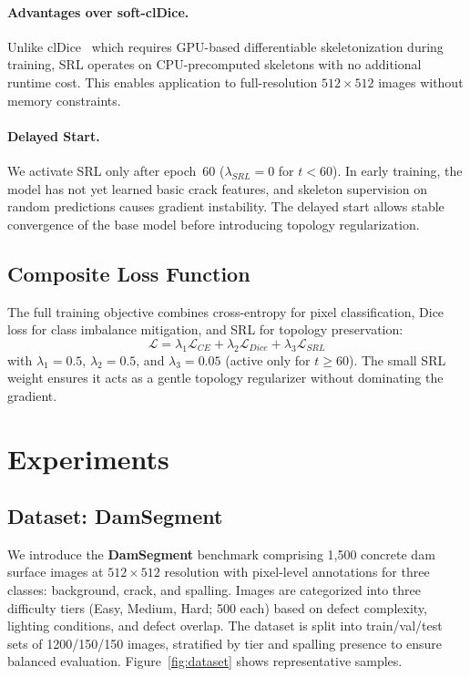 \documentclass[10pt,twocolumn,letterpaper]{article}
\begin{document}
\paragraph{Advantages over soft-clDice.} Unlike clDice~\cite{shit2021cldice} which requires GPU-based differentiable skeletonization during training, SRL operates on CPU-precomputed skeletons with no additional runtime cost. This enables application to full-resolution $512{\times}512$ images without memory constraints.

\paragraph{Delayed Start.} We activate SRL only after epoch~60 ($\lambda_{SRL} = 0$ for $t < 60$). In early training, the model has not yet learned basic crack features, and skeleton supervision on random predictions causes gradient instability. The delayed start allows stable convergence of the base model before introducing topology regularization.

\subsection{Composite Loss Function}

The full training objective combines cross-entropy for pixel classification, Dice loss for class imbalance mitigation, and SRL for topology preservation:
\begin{equation}
    \mathcal{L} = \lambda_1 \mathcal{L}_{CE} + \lambda_2 \mathcal{L}_{Dice} + \lambda_3 \mathcal{L}_{SRL}
    \label{eq:loss}
\end{equation}
with $\lambda_1 = 0.5$, $\lambda_2 = 0.5$, and $\lambda_3 = 0.05$ (active only for $t \geq 60$). The small SRL weight ensures it acts as a gentle topology regularizer without dominating the gradient.

\section{Experiments}
\label{sec:experiments}

\subsection{Dataset: DamSegment}

We introduce the \textbf{DamSegment} benchmark comprising 1,500 concrete dam surface images at $512{\times}512$ resolution with pixel-level annotations for three classes: background, crack, and spalling. Images are categorized into three difficulty tiers (Easy, Medium, Hard; 500 each) based on defect complexity, lighting conditions, and defect overlap. The dataset is split into train/val/test sets of 1200/150/150 images, stratified by tier and spalling presence to ensure balanced evaluation. Figure~\ref{fig:dataset} shows representative samples.
\end{document}
